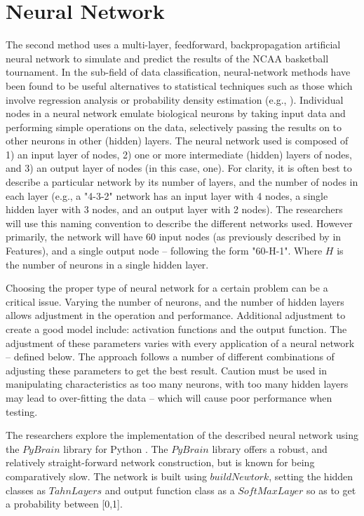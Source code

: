 \documentclass[conference]{IEEEtran}
\begin{document}
{\section{Neural Network}
The second method uses a multi-layer, feedforward, backpropagation artificial neural network to simulate and predict the results of the NCAA basketball tournament.
In the sub-field of data classification, neural-network methods have been found to be useful alternatives to statistical techniques such as those which involve regression analysis or probability density estimation (e.g., \cite{Holmstrom-1192}).
Individual nodes in a neural network emulate biological neurons by taking input data and performing simple operations on the data, selectively passing the results on to other neurons in other (hidden) layers.
The neural network used is composed of 1) an input layer of nodes, 2) one or more intermediate (hidden) layers of nodes, and 3) an output layer of nodes (in this case, one).
For clarity, it is often best to describe a particular network by its number of layers, and the number of nodes in each layer (e.g., a "4-3-2" network has an input layer with 4 nodes, a single hidden layer with 3 nodes, and an output layer with 2 nodes).
The researchers will use this naming convention to describe the different networks used.
However primarily, the network will have 60 input nodes (as previously described by in Features), and a single output node -- following the form "60-H-1".
Where $H$ is the number of neurons in a single hidden layer.

Choosing the proper type of neural network for a certain problem can be a critical issue.
Varying the number of neurons, and the number of hidden layers allows adjustment in the operation and performance.
Additional adjustment to create a good model include: activation functions and the output function\cite{moustafa}. 
The adjustment of these parameters varies with every application of a neural network -- defined below.
The approach follows a number of different combinations of adjusting these parameters to get the best result.
Caution must be used in manipulating characteristics as too many neurons, with too many hidden layers may lead to over-fitting the data -- which will cause poor performance when testing.

The researchers explore the implementation of the described neural network using the $PyBrain$ library for Python \cite{PyBrain}.
The $PyBrain$ library offers a robust, and relatively straight-forward network construction, but is known for being comparatively slow.
The network is built using $buildNewtork$, setting the hidden classes as $TahnLayers$ and output function class as a $SoftMaxLayer$ so as to get a probability between [0,1].

}
\end{document}
